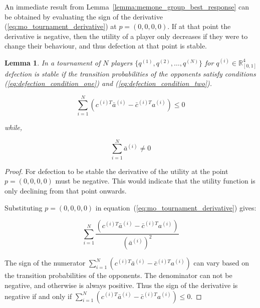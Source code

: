 \documentclass[10pt]{article}
\newcommand{\R}{\mathbb{R}}
\newtheorem{lemma}[theorem]{Lemma}
\begin{document}
An immediate result from Lemma~\ref{lemma:memone_group_best_response} can be
obtained by evaluating the sign of the derivative
(\ref{eq:mo_tournament_derivative}) at \(p=(0, 0, 0, 0)\). If at that point the
derivative is negative, then the utility of a player only decreases if they were
to change their behaviour, and thus defection at that point is stable.

\begin{lemma}\label{lemma:stability_of_defection}
    In a tournament of \(N\) players \(\{q^{(1)}, q^{(2)}, \dots, q^{(N)} \}\)
    for \(q^{(i)} \in \R_{[0, 1]} ^ 4\)
    defection is stable if the transition probabilities of the
    opponents satisfy conditions (\ref{eq:defection_condition_one}) and (\ref{eq:defection_condition_two}).

    \begin{equation}\label{eq:defection_condition_one}
        \sum_{i=1} ^ N (c^{(i)T} \bar{a}^{(i)} - \bar{c}^{(i)T} a^{(i)}) \leq 0
    \end{equation}

    while,

    \begin{equation}\label{eq:defection_condition_two}
        \sum_{i=1} ^ N \bar{a}^{(i)} \neq 0
    \end{equation}
\end{lemma}

\begin{proof}
    For defection to be stable the derivative of the utility
    at the point \(p = (0, 0, 0, 0)\) must be negative. This would indicate that
    the utility function is only declining from that point onwards.

    Substituting \(p = (0, 0, 0, 0)\) in
    equation~(\ref{eq:mo_tournament_derivative}) gives:

    \begin{equation}
    \sum_{i=1} ^ N \frac{(c^{(i)T} \bar{a}^{(i)} - \bar{c}^{(i)T} a^{(i)})}
    {(\bar{a}^{(i)})^2}
    \end{equation}

    The sign of the numerator \( \displaystyle\sum_{i=1} ^ N (c^{(i)T} \bar{a}^{(i)} - \bar{c}^{(i)T} a^{(i)})\)
    can vary based on the transition probabilities of the opponents.
    The denominator can not be negative, and otherwise is always positive.
    Thus the sign of the derivative is negative if and only if
    \( \displaystyle\sum_{i=1} ^ N (c^{(i)T} \bar{a}^{(i)} - \bar{c}^{(i)T} a^{(i)}) \leq 0\).
\end{proof}
\end{document}
